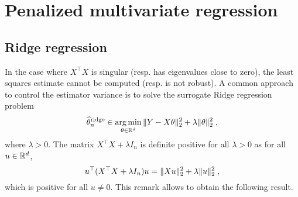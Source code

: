 \chapter{Penalized multivariate regression}
\minitoc


\section{Ridge regression}
In the case where $X^\top X$ is singular (resp. has eigenvalues close to zero), the least squares estimate cannot be computed (resp. is not robust). A common approach to control the estimator variance is to solve the surrogate Ridge regression problem
\[
\widehat \param^{\mathrm{ridge}}_n\in  \argmin_{\param\in\rset^d}  \|Y - X\param\|_2^2 + \lambda\|\param\|_2^2\eqsp,
\]
where $\lambda>0$. The matrix $X^\top X + \lambda I_n$ is definite positive for all $\lambda>0$ as for all $u\in\mathbb{R}^d$,
\[
u^\top (X^\top X + \lambda I_n)u = \|Xu\|_2^2 + \lambda \|u\|_2^2\;,
\]
which is positive for all $u\neq 0$. This remark allows to obtain the following result.

